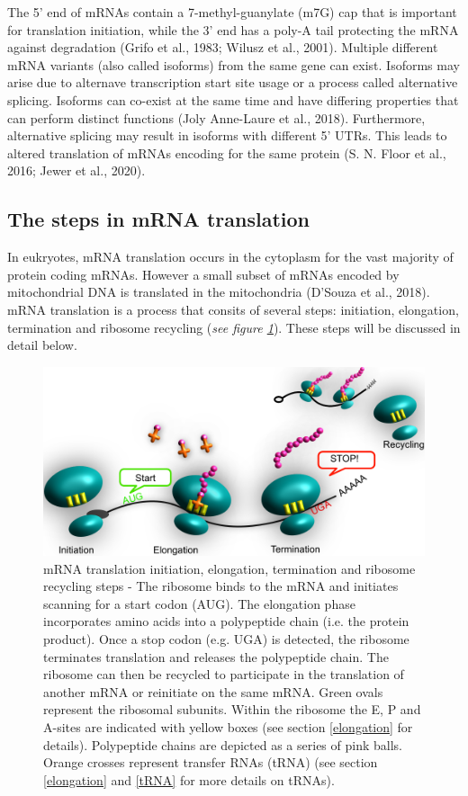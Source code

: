 \documentclass[12pt,openany]{book}
\begin{document}
The 5' end of mRNAs contain a 7-methyl-guanylate (m7G) cap that is
important for translation initiation, while the 3' end has a poly-A tail
protecting the mRNA against degradation (Grifo et al., 1983; Wilusz et
al., 2001). Multiple different mRNA variants (also called isoforms) from
the same gene can exist. Isoforms may arise due to alternave
transcription start site usage or a process called alternative splicing.
Isoforms can co-exist at the same time and have differing properties
that can perform distinct functions (Joly Anne-Laure et al., 2018).
Furthermore, alternative splicing may result in isoforms with different
5' UTRs. This leads to altered translation of mRNAs encoding for the
same protein (S. N. Floor et al., 2016; Jewer et al., 2020).

\subsection{The steps in mRNA translation} \label{translation}

In eukryotes, mRNA translation occurs in the cytoplasm for the vast
majority of protein coding mRNAs. However a small subset of mRNAs
encoded by mitochondrial DNA is translated in the mitochondria (D'Souza
et al., 2018). mRNA translation is a process that consits of several
steps: initiation, elongation, termination and ribosome recycling
(\emph{see figure \ref{fig:doodlemRNASteps}}). These steps will be
discussed in detail below.

\begin{figure}
  \includegraphics{./figures/doodleTranslation.pdf}
  \caption{mRNA translation initiation, elongation, termination and ribosome recycling steps - The ribosome binds to the mRNA and initiates scanning for a start codon (AUG). The elongation phase incorporates amino acids into a polypeptide chain (i.e. the protein product). Once a stop codon (e.g. UGA) is detected, the ribosome terminates translation and releases the polypeptide chain. The ribosome can then be recycled to participate in the translation of another mRNA or reinitiate on the same mRNA. Green ovals represent the ribosomal subunits. Within the ribosome the E, P and A-sites are indicated with yellow boxes (see section \ref{elongation} for details). Polypeptide chains are depicted as a series of pink balls. Orange crosses represent transfer RNAs (tRNA) (see section \ref{elongation} and \ref{tRNA} for more details on tRNAs).  \label{fig:doodlemRNASteps}}
\end{figure}
\end{document}
